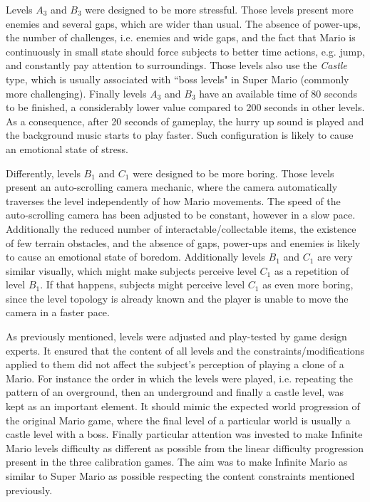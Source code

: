 Levels $A_3$ and $B_3$ were designed to be more stressful. Those levels present more enemies and several gaps, which are wider than usual. The absence of power-ups, the number of challenges, i.e. enemies and wide gaps, and the fact that Mario is continuously in small state should force subjects to better time actions, e.g. jump, and constantly pay attention to surroundings. Those levels also use the \textit{Castle} type, which is usually associated with ``boss levels" in Super Mario (commonly more challenging). Finally levels $A_3$ and $B_3$ have an available time of 80 seconds to be finished, a considerably lower value compared to 200 seconds in other levels. As a consequence, after 20 seconds of gameplay, the hurry up sound is played and the background music starts to play faster. Such configuration is likely to cause an emotional state of stress.

Differently, levels $B_1$ and $C_1$ were designed to be more boring. Those levels present an auto-scrolling camera mechanic, where the camera automatically traverses the level independently of how Mario movements. The speed of the auto-scrolling camera has been adjusted to be constant, however in a slow pace. Additionally the reduced number of interactable/collectable items, the existence of few terrain obstacles, and the absence of gaps, power-ups and enemies is likely to cause an emotional state of boredom. Additionally levels $B_1$ and $C_1$ are very similar visually, which might make subjects perceive level $C_1$ as a repetition of level $B_1$. If that happens, subjects might perceive level $C_1$ as even more boring, since the level topology is already known and the player is unable to move the camera in a faster pace.

As previously mentioned, levels were adjusted and play-tested by game design experts. It ensured that the content of all levels and the constraints/modifications applied to them did not affect the subject's perception of playing a clone of a Mario. For instance the order in which the levels were played, i.e. repeating the pattern of an overground, then an underground and finally a castle level, was kept as an important element. It should mimic the expected world progression of the original Mario game, where the final level of a particular world is usually a castle level with a boss. Finally particular attention was invested to make Infinite Mario levels difficulty as different as possible from the linear difficulty progression present in the three calibration games. The aim was to make Infinite Mario as similar to Super Mario as possible respecting the content constraints mentioned previously.

